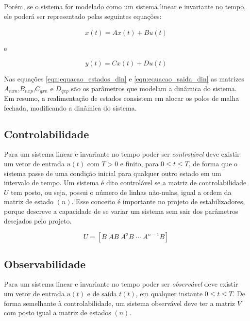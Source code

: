 \documentclass[
	12pt,				%
	openany,			%
	oneside,			%
	a4paper,			%
	english,			%
	french,				%
	spanish,			%
	brazil,				%
	]{abntex2}
\begin{document}
{Porém, se o sistema for modelado como um sistema linear e invariante no tempo, ele poderá ser representado pelas seguintes equações:

\begin{equation}
	\dot{x(t)} = Ax(t) + Bu(t)
	\label{eqn:equacao_estados_din}
\end{equation}

e

\begin{equation}
	y(t) = Cx(t) + Du(t)
	\label{eqn:equacao_saida_din}
\end{equation}

Nas equações \ref{eqn:equacao_estados_din} e \ref{eqn:equacao_saida_din} as matrizes $A_{nxn}$,$B_{nxp}$,$C_{qxn}$ e $D_{qxp}$ são os parâmetros que modelam a dinâmica do sistema. Em resumo, a realimentação de estados consistem em alocar os polos de malha fechada, modificando a dinâmica do sistema.

\subsection{Controlabilidade}

Para um sistema linear e invariante no tempo poder ser \textit{controlável} deve existir um vetor de entrada $u(t)$ com $T>0$ e finito, para $0 \leq t \leq T$, de forma que o sistema passe de uma condição inicial para qualquer outro estado em um intervalo de tempo. Um sistema é dito controlável se a matriz de controlabilidade $U$ tem posto, ou seja, possui o número de linhas não-nulas, igual a ordem da matriz de estado $(n)$. Esse conceito é importante no projeto de estabilizadores, porque descreve a capacidade de se variar um sistema sem sair dos parâmetros desejados pelo projeto.

\begin{equation}
	U = \left[B \; AB \; A^2B \; \cdots \; A^{n-1}B \right]
\end{equation}

\subsection{Observabilidade}

Para um sistema linear e invariante no tempo poder ser \textit{observável} deve existir um vetor de entrada $u(t)$ e de saída $t(t)$, em qualquer instante $0 \leq t \leq T$. De forma semelhante à controlabilidade, um sistema observável deve ter a matriz $V$ com posto igual a matriz de estados $(n)$.


}
\end{document}
